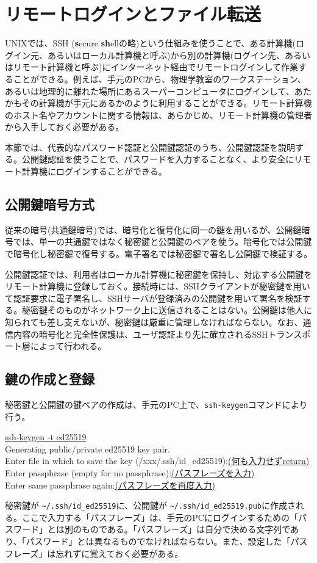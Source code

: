 \section{リモートログインとファイル転送}
\label{sec:ssh}

UNIXでは、SSH (\textbf{s}ecure \textbf{sh}ellの略)という仕組みを使うことで、ある計算機(ログイン元、あるいはローカル計算機と呼ぶ)から別の計算機(ログイン先、あるいはリモート計算機と呼ぶ)にインターネット経由でリモートログインして作業することができる。例えば、手元のPCから、物理学教室のワークステーション、あるいは地理的に離れた場所にあるスーパーコンピュータにログインして、あたかもその計算機が手元にあるかのように利用することができる。リモート計算機のホスト名やアカウントに関する情報は、あらかじめ、リモート計算機の管理者から入手しておく必要がある。

本節では、代表的なパスワード認証と公開鍵認証のうち、公開鍵認証を説明する。公開鍵認証を使うことで、パスワードを入力することなく、より安全にリモート計算機にログインすることができる。

\subsection{公開鍵暗号方式}

従来の暗号(共通鍵暗号)では、暗号化と復号化に同一の鍵を用いるが、公開鍵暗号では、単一の共通鍵ではなく秘密鍵と公開鍵のペアを使う。暗号化では公開鍵で暗号化し秘密鍵で復号する。電子署名では秘密鍵で署名し公開鍵で検証する。

公開鍵認証では、利用者はローカル計算機に秘密鍵を保持し、対応する公開鍵をリモート計算機に登録しておく。接続時には、SSHクライアントが秘密鍵を用いて認証要求に電子署名し、SSHサーバが登録済みの公開鍵を用いて署名を検証する。秘密鍵そのものがネットワーク上に送信されることはない。公開鍵は他人に知られても差し支えないが、秘密鍵は厳重に管理しなければならない。なお、通信内容の暗号化と完全性保護は、ユーザ認証より先に確立されるSSHトランスポート層によって行われる。

\subsection{鍵の作成と登録}

秘密鍵と公開鍵の鍵ペアの作成は、手元のPC上で、\texttt{ssh-keygen}コマンドにより行う。
\begin{commandline2}
    \prompt \underline{ssh-keygen -t ed25519} \\
    Generating public/private ed25519 key pair.\\
    Enter file in which to save the key (/xxx/.ssh/id\_ed25519):\underline{(何も入力せずreturn)}\\
    Enter passphrase (empty for no passphrase):\underline{(パスフレーズを入力)}\\
    Enter same passphrase again:\underline{(パスフレーズを再度入力)}
\end{commandline2} \noindent
秘密鍵が \texttt{\~{}/.ssh/id\_ed25519}に、公開鍵が \texttt{\~{}/.ssh/id\_ed25519.pub}に作成される。ここで入力する「パスフレーズ」は、手元のPCにログインするための「パスワード」とは別のものである。「パスフレーズ」は自分で決める文字列であり、「パスワード」とは異なるものでなければならない。また、設定した「パスフレーズ」は忘れずに覚えておく必要がある。

